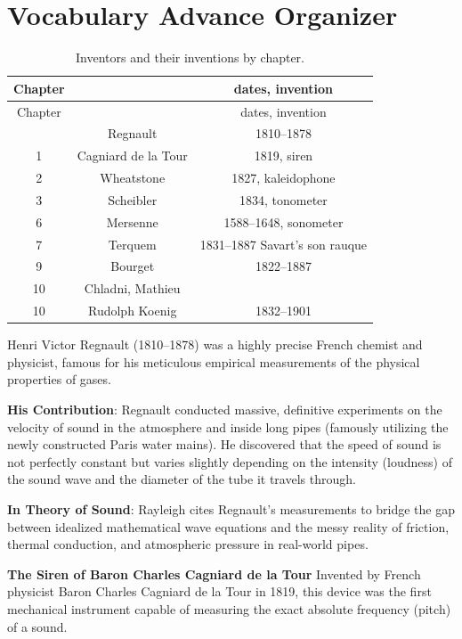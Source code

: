 \section{Vocabulary Advance
Organizer}\label{vocabulary-advance-organizer}

\begin{longtable}[]{@{}ccc@{}}
\caption{Inventors and their inventions by chapter.}\label{tbl:nomenclature3}\tabularnewline%
Chapter & & dates, invention \\
\midrule\noalign{}
\endfirsthead%
\toprule\noalign{}
Chapter & & dates, invention \\
\midrule\noalign{}
\endhead%
\endlastfoot%
1 & Regnault & 1810--1878 \\
1 & Cagniard de la Tour & 1819, siren \\
2 & Wheatstone & 1827, kaleidophone \\
3 & Scheibler & 1834, tonometer \\
6 & Mersenne & 1588--1648, sonometer \\
7 & Terquem & 1831--1887 Savart's son rauque \\
9 & Bourget & 1822--1887 \\
10 & Chladni, Mathieu & \\
10 & Rudolph Koenig & 1832--1901 \\
\end{longtable}

Henri Victor Regnault (1810--1878) was a highly precise French chemist
and physicist, famous for his meticulous empirical measurements of the
physical properties of gases.

\textbf{His Contribution}: Regnault conducted massive, definitive
experiments on the velocity of sound in the atmosphere and inside long
pipes (famously utilizing the newly constructed Paris water mains). He
discovered that the speed of sound is not perfectly constant but varies
slightly depending on the intensity (loudness) of the sound wave and the
diameter of the tube it travels through.

\textbf{In Theory of Sound}: Rayleigh cites Regnault's measurements to
bridge the gap between idealized mathematical wave equations and the
messy reality of friction, thermal conduction, and atmospheric pressure
in real-world pipes.

\textbf{The Siren of Baron Charles Cagniard de la Tour} Invented by
French physicist Baron Charles Cagniard de la Tour in 1819, this device
was the first mechanical instrument capable of measuring the exact
absolute frequency (pitch) of a sound.

